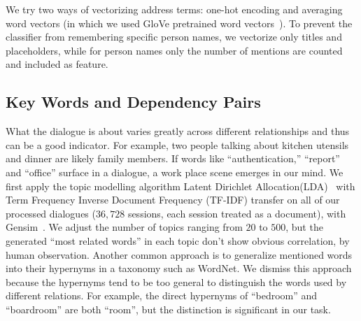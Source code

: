 We try two ways of vectorizing address terms: one-hot encoding and 
averaging word vectors (in which we used GloVe pretrained word 
vectors~\cite{glove}). To prevent the classifier from remembering specific person names, 
we vectorize only titles and placeholders, 
while for person names only the number of mentions are counted and
included as feature.

\subsection{Key Words and Dependency Pairs} 
What the dialogue is about varies greatly across different 
relationships and thus can be a good indicator. For example, 
two people talking about kitchen utensils and dinner are likely 
family members. If words like ``authentication,'' ``report'' 
and ``office'' surface in a dialogue, 
a work place scene emerges in our mind. 
We first apply the topic modelling algorithm 
Latent Dirichlet Allocation(LDA)~\cite{LDA} with 
Term Frequency Inverse Document Frequency (TF-IDF) 
transfer on all of our processed dialogues ($36,728$ sessions, 
each session treated as a document), with Gensim~\cite{gensim}.
We adjust the number of topics ranging from $20$ to $500$, 
but the generated ``most related words'' in each topic don't
show obvious correlation, by human observation.
Another common approach is to generalize mentioned words into
their hypernyms in a taxonomy such as WordNet. 
We dismiss this approach because the hypernyms tend to be
too general to distinguish the words used by different relations.
For example, the direct hypernyms of ``bedroom'' and ``boardroom'' 
are both ``room'', but the distinction is significant in our task.
